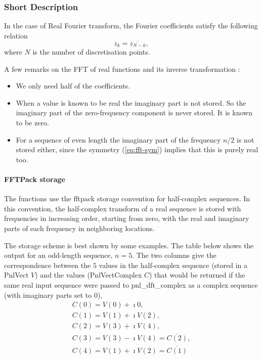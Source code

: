 \subsubsection{Short Description}

In the case of Real Fourier transform, the Fourier coefficients satisfy the
following relation
\begin{equation}
  \label{eq:fft-sym}
  z_k = \overline{z_{N-k}}, 
\end{equation}
where $N$ is the number of discretisation points.

A few remarks on the FFT of real functions and its inverse transformation :
\begin{itemize}
\item We only need half of the coefficients.
\item When a value is known to be real the imaginary part is not stored.
So the imaginary part of the zero-frequency component is never stored. It is
known to be zero.
\item For a sequence of even length the imaginary part of the frequency
  $n/2$ is not stored either, since the symmetry (\ref{eq:fft-sym}) implies
  that this is purely real too.
\end{itemize}


\paragraph{FFTPack storage}
\label{sec:fftpack-storage}

The functions use the fftpack storage convention for half-complex sequences.
In this convention, the half-complex transform of a real sequence is stored
with frequencies in increasing order, starting from zero, with the real and
imaginary parts of each frequency in neighboring locations.

The storage scheme is best shown by some examples. The table below shows the
output for an odd-length sequence, $n=5$.  The two columns give the
correspondence between the $5$ values in the half-complex sequence (stored in
a PnlVect $V$) and the values (PnlVectComplex $C$) that would be returned if
the same real input sequence were passed to pnl_dft_complex as a complex
sequence (with imaginary parts set to 0), 
\begin{equation}
  \begin{array}{l}
         C(0) =  V(0) + \imath 0, \\ 
         C(1) =  V(1) + \imath V(2), \\
         C(2) =  V(3) + \imath V(4), \\
         C(3) = V(3) - \imath V(4)=  \overline{C(2)} , \\
         C(4) = V(1) + \imath V(2)=  \overline{C(1)} 
  \end{array}   
\end{equation}

